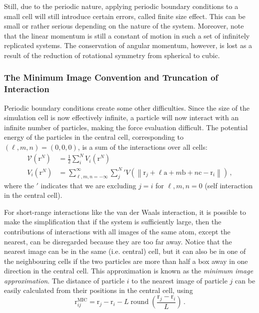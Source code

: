 \documentclass{article}
\theoremstyle{plain}\theoremheaderfont{\normalfont\itshape}\theorembodyfont{\rmfamily}\theoremseparator{.}\newtheorem*{rem}{Remark}\newtheorem*{ex}{Example}\newtheorem*{proof}{Proof}\newtheorem*{altp}{Alternative proof}
\theoremstyle{plain}\theoremheaderfont{\normalfont\bfseries}\theorembodyfont{\rmfamily}\theoremseparator{.}\newtheorem{thm}{Theorem}[section]\newtheorem{lem}[thm]{Lemma}\newtheorem{prop}[thm]{Proposition}\newtheorem*{cor}{Corollary}\newtheorem{defn}[thm]{Definition}\newtheorem{clm}[thm]{Claim}\newtheorem{clminproof}{Claim}\newtheorem{alg}[thm]{Algorithm}\newtheorem{hyp}[thm]{Hypothesis}\newtheorem{law}[thm]{Law}
\theoremstyle{break}\theoremheaderfont{\normalfont\itshape}\theorembodyfont{\rmfamily}\theoremseparator{.\medskip}\newtheorem*{proofskip}{Proof}\newtheorem*{exs}{Examples}\newtheorem*{rems}{Remarks}
\theoremstyle{break}\theoremheaderfont{\normalfont\bfseries}\theorembodyfont{\rmfamily}\theoremseparator{.\medskip}\newtheorem{lemskip}[thm]{Lemma}\newtheorem{defnskip}[thm]{Definition}\newtheorem{propskip}[thm]{Proposition}\newtheorem{thmskip}[thm]{Theorem}
\numberwithin{equation}{section}
\newcommand{\vb}[1]{\bm{\mathrm{#1}}}
\newcommand{\norm}[1]{\left\| #1 \right\|}
\DeclareMathOperator{\round}{round}
\begin{document}
    Still, due to the periodic nature, applying periodic boundary conditions to a small cell will still introduce certain errors, called finite size effect. This can be small or rather serious depending on the nature of the system. Moreover, note that the linear momentum is still a constant of motion in such a set of infinitely replicated systems. The conservation of angular momentum, however, is lost as a result of the reduction of rotational symmetry from spherical to cubic.

    \subsubsection{The Minimum Image Convention and Truncation of Interaction}
    Periodic boundary conditions create some other difficulties. Since the size of the simulation cell is now effectively infinite, a particle will now interact with an infinite number of particles, making the force evaluation difficult. The potential energy of the particles in the central cell, corresponding to \((\ell,m,n)=(0,0,0)\), is a sum of the interactions over all cells:
    \begin{align}
        \mathcal{V}(\vb{r}^N)&=\frac{1}{2}\sum_{i}^{N}V_i(\vb{r}^N)\\
        V_i(\vb{r}^N)&=\sum_{\ell,m,n=-\infty}^{\infty}{\sum_{j}^{N}}'V(\norm{\vb{r}_j+\ell\vb{a}+m\vb{b}+n\vb{c}-\vb{r}_i})\,,
    \end{align} 
    where the \('\) indicates that we are excluding \(j=i\) for \(\ell,m,n=0\) (self interaction in the central cell).

    For short-range interactions like the van der Waals interaction, it is possible to make the simplification that if the system is sufficiently large, then the contributions of interactions with all images of the same atom, except the nearest, can be disregarded because they are too far away. Notice that the nearest image can be in the same (i.e. central) cell, but it can also be in one of the neighbouring cells if the two particles are more than half a box away in one direction in the central cell. This approximation is known as the \textit{minimum image approximation}. The distance of particle \(i\) to the nearest image of particle \(j\) can be easily calculated from their positions in the central cell, using
    \begin{equation}
        \vb{r}_{ij}^{\text{MIC}}=\vb{r}_j-\vb{r}_i-L\round\left(\frac{\vb{r}_j-\vb{r}_i}{L}\right)\,.
    \end{equation}
\end{document}
